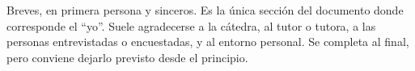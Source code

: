 
\begin{guia}
Breves, en primera persona y sinceros. Es la única sección del documento
donde corresponde el ``yo''. Suele agradecerse a la cátedra, al tutor o
tutora, a las personas entrevistadas o encuestadas, y al entorno personal.
Se completa al final, pero conviene dejarlo previsto desde el principio.
\end{guia}

